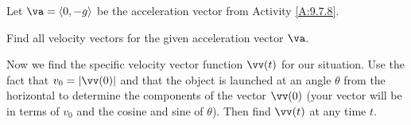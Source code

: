 \begin{activity} \label{A:9.7.9} Let $\va = \langle 0, -g \rangle$ be the acceleration vector from Activity \ref{A:9.7.8}.
\ba
    \item Find all velocity vectors for the given acceleration vector $\va$.



\begin{comment}

Integrating the acceleration vector gives us the velocity vector value
\[\vv(t) = \int \va(t) \ dt = \langle 0, -gt \rangle + \vc,\]
where $\vc$ is some constant vector.

\end{comment}

    \item Now we find the specific velocity vector function $\vv(t)$ for our situation. Use the fact that $v_0 = |\vv(0)|$ and that the object is launched at an angle $\theta$ from the horizontal to determine the components of the vector $\vv(0)$ (your vector will be in terms of $v_0$ and the cosine and sine of $\theta$). Then find $\vv(t)$ at any time $t$.



\begin{comment} Note that $\vv(0) = \langle v_0 \cos(\theta), \v_0 \sin(\theta) \rangle$, so we have
\[\langle v_0 \cos(\theta), \v_0 \sin(\theta) \rangle = \langle 0, -g(0) \rangle + \vc\]
and
\[\vc = \langle v_0 \cos(\theta), \v_0 \sin(\theta) \rangle.\]
So
\[\vv(t) =  \langle v_0 \cos(\theta), -gt + \v_0 \sin(\theta) \rangle.\]

\end{comment}

    \ea
\end{activity}
\begin{smallhint}

\end{smallhint}
\begin{bighint}

\end{bighint}
\begin{activitySolution}

\end{activitySolution}
\aftera
